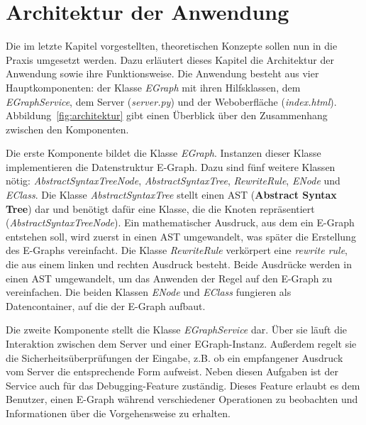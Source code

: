 \section{Architektur der Anwendung}\label{sec:architektur}

Die im letzte Kapitel vorgestellten, theoretischen Konzepte sollen nun in die Praxis umgesetzt werden.
Dazu erläutert dieses Kapitel die Architektur der Anwendung sowie ihre Funktionsweise.
Die Anwendung besteht aus vier Hauptkomponenten: der Klasse \textit{EGraph} mit ihren Hilfsklassen, dem \textit{EGraphService}, dem Server (\textit{server.py}) und der
Weboberfläche (\textit{index.html}). Abbildung~\ref{fig:architektur} gibt einen Überblick über den Zusammenhang zwischen den Komponenten. 

Die erste Komponente bildet die Klasse \textit{EGraph}. Instanzen dieser Klasse implementieren die Datenstruktur E-Graph. Dazu sind fünf weitere Klassen nötig: 
\textit{AbstractSyntaxTreeNode}, \textit{AbstractSyntaxTree}, \textit{RewriteRule}, \textit{ENode} und \textit{EClass}.
Die Klasse \textit{AbstractSyntaxTree} stellt einen AST (\textbf{Abstract Syntax Tree}) dar und benötigt dafür eine Klasse, die die Knoten repräsentiert (\textit{AbstractSyntaxTreeNode}).
Ein mathematischer Ausdruck, aus dem ein E-Graph entstehen soll, wird zuerst in einen AST umgewandelt, was später die Erstellung des E-Graphs vereinfacht.
Die Klasse \textit{RewriteRule} verkörpert eine \textit{rewrite rule}, die aus einem linken und rechten Ausdruck besteht. Beide Ausdrücke werden in einen AST umgewandelt, um das
Anwenden der Regel auf den E-Graph zu vereinfachen.
Die beiden Klassen \textit{ENode} und \textit{EClass} fungieren als Datencontainer, auf die der E-Graph aufbaut.

Die zweite Komponente stellt die Klasse \textit{EGraphService} dar. Über sie läuft die Interaktion zwischen dem Server und einer EGraph-Instanz.
Außerdem regelt sie die Sicherheitsüberprüfungen der Eingabe, z.B. ob ein empfangener Ausdruck vom Server die entsprechende Form aufweist.
Neben diesen Aufgaben ist der Service auch für das Debugging-Feature zuständig. Dieses Feature erlaubt es dem Benutzer, einen E-Graph während verschiedener Operationen
zu beobachten und Informationen über die Vorgehensweise zu erhalten. 

